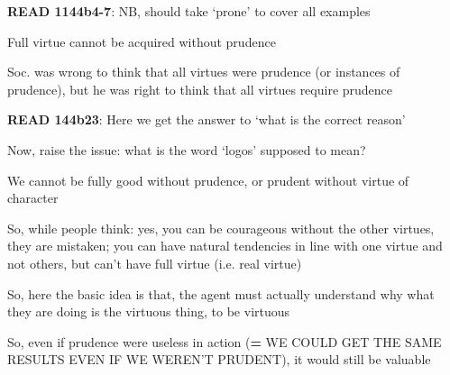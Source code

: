 \documentclass[11pt]{article}
\begin{document}
\noindent\textbf{READ 1144b4-7}: NB, should take `prone' to cover all examples
\vspace*{2mm}

\noindent Full virtue cannot be acquired without prudence
\vspace*{2mm}

\noindent Soc. was wrong to think that all virtues were prudence (or instances of prudence), but he was right to think that all virtues require prudence
\vspace*{2mm}

\noindent\textbf{READ 144b23}: Here we get the answer to `what is the correct reason'
\vspace*{2mm}

\noindent Now, raise the issue: what is the word `logos' supposed to mean?
\vspace*{2mm}

\noindent We cannot be fully good without prudence, or prudent without virtue of character
\vspace*{2mm}

\noindent So, while people think: yes, you can be courageous without the other virtues, they are mistaken; you can have natural tendencies in line with one virtue and not others, but can't have full virtue (i.e. real virtue)
\vspace*{2mm}

\noindent So, here the basic idea is that, the agent must actually understand why what they are doing is the virtuous thing, to be virtuous
\vspace*{2mm}

\noindent So, even if prudence were useless in action (\textbf= WE COULD GET THE SAME RESULTS EVEN IF WE WEREN'T PRUDENT), it would still be valuable
\end{document}

